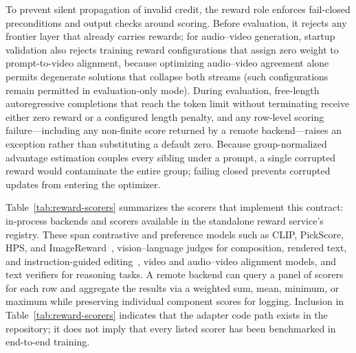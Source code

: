 To prevent silent propagation of invalid credit, the reward role enforces fail-closed preconditions and output checks around scoring.
Before evaluation, it rejects any frontier layer that already carries rewards; for audio--video generation, startup validation also rejects training reward configurations that assign zero weight to prompt-to-video alignment, because optimizing audio--video agreement alone permits degenerate solutions that collapse both streams (such configurations remain permitted in evaluation-only mode).
During evaluation, free-length autoregressive completions that reach the token limit without terminating receive either zero reward or a configured length penalty, and any row-level scoring failure---including any non-finite score returned by a remote backend---raises an exception rather than substituting a default zero.
Because group-normalized advantage estimation couples every sibling under a prompt, a single corrupted reward would contaminate the entire group; failing closed prevents corrupted updates from entering the optimizer.

Table~\ref{tab:reward-scorers} summarizes the scorers that implement this contract: \RSLocalBackends{} in-process backends and \RSServiceScorers{} scorers available in the standalone reward service's registry.
These span contrastive and preference models such as CLIP, PickScore, HPS, and ImageReward~\citep{radford2021clip,kirstain2023pickapic,wu2023hpsv2,ma2025hpsv3,xu2023imagereward}, vision--language judges for composition, rendered text, and instruction-guided editing~\citep{kamath2025geneval2,wu2025editreward,luo2025editscore}, video and audio--video alignment models, and text verifiers for reasoning tasks.
A remote backend can query a panel of scorers for each row and aggregate the results via a weighted sum, mean, minimum, or maximum while preserving individual component scores for logging.
Inclusion in Table~\ref{tab:reward-scorers} indicates that the adapter code path exists in the repository; it does not imply that every listed scorer has been benchmarked in end-to-end training.

\begin{table}[H]
\caption{Reward implementations in UniRL, grouped by scored output modality. Names denote registry keys. $^{\ast}$Present in the registry but disabled in the default service configuration.}
\label{tab:reward-scorers}
\centering
\small

\end{table}

